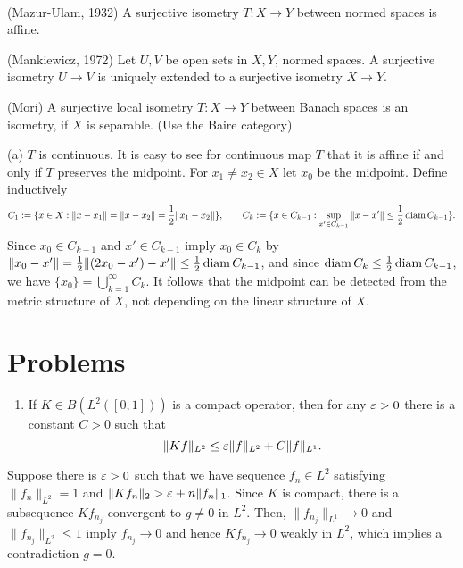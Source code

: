 \documentclass{../../large}
\begin{document}
\begin{prb}\,
\begin{parts}
\item (Mazur-Ulam, 1932) A surjective isometry $T:X\to Y$ between normed spaces is affine.
\item (Mankiewicz, 1972) Let $U,V$ be open sets in $X,Y$, normed spaces. A surjective isometry $U\to V$ is uniquely extended to a surjective isometry $X\to Y$.
\item (Mori) A surjective local isometry $T:X\to Y$ between Banach spaces is an isometry, if $X$ is separable. (Use the Baire category)
\end{parts}
\end{prb}
\begin{sol}
(a)
$T$ is continuous.
It is easy to see for continuous map $T$ that it is affine if and only if $T$ preserves the midpoint.
For $x_1\ne x_2\in X$ let $x_0$ be the midpoint.
Define inductively
\[C_1:=\{x\in X:\|x-x_1\|=\|x-x_2\|=\frac12\|x_1-x_2\|\},\qquad C_k:=\{x\in C_{k-1}:\sup_{x'\in C_{k-1}}\|x-x'\|\le\frac12\operatorname{diam} C_{k-1}\}.\]
Since $x_0\in C_{k-1}$ and $x'\in C_{k-1}$ imply $x_0\in C_k$ by $\|x_0-x'\|=\frac12\|(2x_0-x')-x'\|\le\frac12\operatorname{diam} C_{k-1}$, and since $\operatorname{diam} C_k\le\frac12\operatorname{diam} C_{k-1}$, we have $\{x_0\}=\bigcup_{k=1}^\infty C_k$.
It follows that the midpoint can be detected from the metric structure of $X$, not depending on the linear structure of $X$.
\end{sol}


\section*{Problems}
\begin{enumerate}
\item If $K\in B(L^2([0,1]))$ is a compact operator, then for any $\varepsilon>0$ there is a constant $C>0$ such that
\[\|Kf\|_{L^2}\le\varepsilon\|f\|_{L^2}+C\|f\|_{L^1}.\]
\end{enumerate}

\begin{pf}
Suppose there is $\varepsilon>0$ such that we have sequence $f_n\in L^2$ satisfying $\|f_n\|_{L^2}=1$ and $\|Kf_n\|_2>\varepsilon+n\|f_n\|_1$.
Since $K$ is compact, there is a subsequence $Kf_{n_j}$ convergent to $g\ne0$ in $L^2$.
Then, $\|f_{n_j}\|_{L^1}\to0$ and $\|f_{n_j}\|_{L^2}\le1$ imply $f_{n_j}\to0$ and hence $Kf_{n_j}\to0$ weakly in $L^2$, which implies a contradiction $g=0$.
\end{pf}
\end{document}
